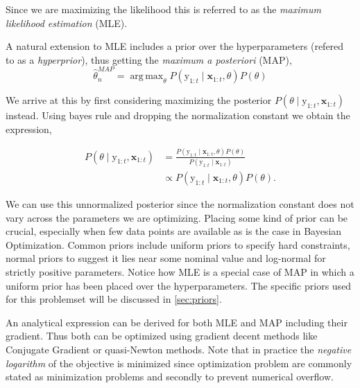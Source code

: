 \documentclass[conference,compsoc]{IEEEtran}
\DeclareMathOperator*{\argmax}{arg\,max}
\theoremstyle{definition}
\begin{document}
                \noindent Since we are maximizing the likelihood this is referred to as the \emph{maximum likelihood estimation} (MLE).

                A natural extension to MLE includes a prior over the hyperparameters (refered to as a \emph{hyperprior}), thus getting the \emph{maximum a posteriori} (MAP), 
                    \begin{equation}\hat{\theta}_n^{MAP} = \argmax_{\theta} P(\bm{\mathrm{y}}_{1:t}\mid\bm{x}_{1:t},\theta) P(\theta)\end{equation}

                \noindent We arrive at this by first considering maximizing the posterior $P(\theta\mid\bm{\mathrm{y}}_{1:t},\bm{x}_{1:t})$ instead.
                Using bayes rule and dropping the normalization constant we obtain the expression,

                \begin{equation}
                    \begin{split}
                        P(\theta\mid\bm{\mathrm{y}}_{1:t},\bm{x}_{1:t})
                        &= \frac{P(\bm{\mathrm{y}}_{1:t}\mid\bm{x}_{1:t}, \theta)P(\theta)}
                        {P(\bm{\mathrm{y}}_{1:t}\mid \bm{x}_{1:t})}\\
                        &\propto P(\bm{\mathrm{y}}_{1:t}\mid\bm{x}_{1:t},\theta)P(\theta)
                        .
                    \end{split}
                \end{equation}

                We can use this unnormalized posterior since the normalization constant does not vary across the parameters we are optimizing.
                Placing some kind of prior can be crucial, especially when few data points are available as is the case in Bayesian Optimization.
                Common priors include uniform priors to specify hard constraints, normal priors to suggest it lies near some nominal value and log-normal for strictly positive parameters.
                Notice how MLE is a special case of MAP in which a uniform prior has been placed over the hyperparameters.
                The specific priors used for this problemset will be discussed in \cref{sec:priors}.

                An analytical expression can be derived for both MLE and MAP \parencite{rasmussen_gaussian_2006} including their gradient.
                Thus both can be optimized using gradient decent methods like Conjugate Gradient or quasi-Newton methods.
                Note that in practice the \emph{negative logarithm} of the objective is minimized since optimization problem are commonly stated as minimization problems and secondly to prevent numerical overflow.
\end{document}
